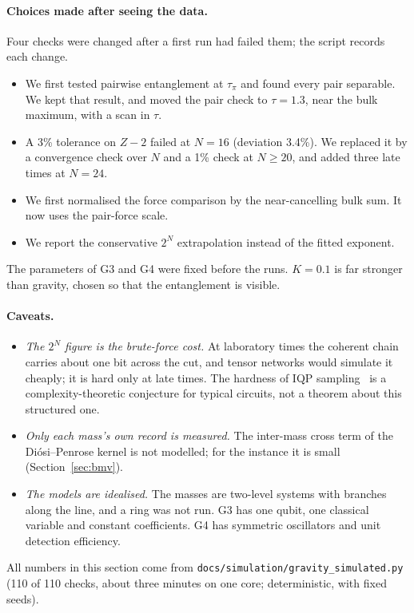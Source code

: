 \paragraph{Choices made after seeing the data.} Four checks were changed after a first run had failed them; the script records each change.
\begin{itemize}[nosep]
\item We first tested pairwise entanglement at $\tau_\pi$ and found every pair separable. We kept that result, and moved the pair check to
$\tau=1.3$, near the bulk maximum, with a scan in $\tau$.
\item A 3\% tolerance on $Z-2$ failed at $N=16$ (deviation 3.4\%). We replaced it by a convergence check over $N$ and a 1\% check at
$N\ge20$, and added three late times at $N=24$.
\item We first normalised the force comparison by the near-cancelling bulk sum. It now uses the pair-force scale.
\item We report the conservative $2^N$ extrapolation instead of the fitted exponent.
\end{itemize}
The parameters of G3 and G4 were fixed before the runs. $K=0.1$ is far stronger than gravity, chosen so that the entanglement is visible.

\paragraph{Caveats.}
\begin{itemize}[nosep]
\item \emph{The $2^N$ figure is the brute-force cost.} At laboratory times the coherent chain carries about one bit across the cut, and
tensor networks would simulate it cheaply; it is hard only at late times. The hardness of IQP sampling~\cite{bremner2011,bremner2016} is a
complexity-theoretic conjecture for typical circuits, not a theorem about this structured one.
\item \emph{Only each mass's own record is measured.} The inter-mass cross term of the Di\'osi--Penrose kernel is not modelled; for the
instance it is small (Section~\ref{sec:bmv}).
\item \emph{The models are idealised.} The masses are two-level systems with branches along the line, and a ring was not run. G3 has one
qubit, one classical variable and constant coefficients. G4 has symmetric oscillators and unit detection efficiency.
\end{itemize}

All numbers in this section come from \texttt{docs/simulation/gravity\_simulated.py} (110 of 110 checks, about three minutes on one core;
deterministic, with fixed seeds).

